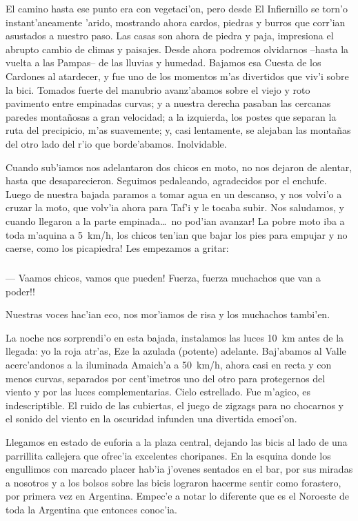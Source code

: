 El camino hasta ese punto era con vegetaci'on, pero desde El Infiernillo se
torn'o instant'aneamente 'arido, mostrando ahora cardos, piedras y burros que
corr'ian asustados a nuestro paso. Las casas son ahora de piedra y paja,
impresiona el abrupto cambio de climas y paisajes. Desde ahora podremos
olvidarnos --hasta la vuelta a las Pampas-- de las lluvias y humedad. Bajamos
esa Cuesta de los Cardones al atardecer, y fue uno de los momentos m'as
divertidos que viv'i sobre la bici. Tomados fuerte del manubrio avanz'abamos
sobre el viejo y roto pavimento entre empinadas curvas; y a nuestra derecha
pasaban las cercanas paredes monta\~nosas a gran velocidad; a la izquierda, los
postes que separan la ruta del precipicio, m'as suavemente; y, casi lentamente,
se alejaban las monta\~nas del otro lado del r'io que borde'abamos. Inolvidable.

Cuando sub'iamos nos adelantaron dos chicos en moto, no nos dejaron de
alentar, hasta que desaparecieron. Seguimos pedaleando, agradecidos por el
enchufe. Luego de nuestra bajada paramos a tomar agua en un descanso, y nos
volvi'o a cruzar la moto, que volv'ia ahora para Taf'i y le tocaba subir. Nos
saludamos, y cuando llegaron a la parte empinada\ldots\ \textexclamdown no
pod'ian avanzar! La pobre moto iba a toda m'aquina a 5~km/h, \textexclamdown los
chicos ten'ian que bajar los pies para empujar y no caerse, como los picapiedra!
Les empezamos a gritar:

\subparagraph{}\label{ssub:alentando} --- \textexclamdown Vaamos chicos, vamos
que pueden! \textexclamdown \textexclamdown Fuerza, fuerza muchachos que van a
poder!!\\ \hangindent=1cm

Nuestras voces hac'ian eco, nos mor'iamos de risa y los muchachos tambi'en.

La noche nos sorprendi'o en esta bajada, instalamos las luces 10~km antes de
la llegada: yo la roja atr'as, Eze la azulada (potente) adelante. Baj'abamos al
Valle acerc'andonos a la iluminada Amaich'a a 50~km/h, ahora casi en recta y con
menos curvas, separados por cent'imetros uno del otro para protegernos del
viento y por las luces complementarias. Cielo estrellado. Fue m'agico, es
indescriptible. El ruido de las cubiertas, el juego de zigzags para no chocarnos
y el sonido del viento en la oscuridad infunden una divertida emoci'on.

Llegamos en estado de euforia a la plaza central, dejando las bicis al lado de
una parrillita callejera que ofrec'ia excelentes choripanes. En la esquina donde
los engullimos con marcado placer hab'ia j'ovenes sentados en el bar, por sus
miradas a nosotros y a los bolsos sobre las bicis lograron hacerme sentir como
forastero, por primera vez en Argentina. Empec'e a notar lo diferente que es el
Noroeste de toda la Argentina que entonces conoc'ia.

